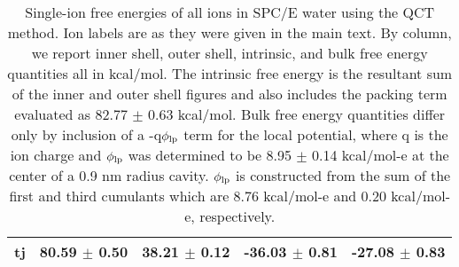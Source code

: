 \begin{table}
\begin{center}
\begin{tabular}{ccccc}
tj	&	80.59	$\pm$	0.50	&	38.21	$\pm$	0.12	&	-36.03	$\pm$	0.81	&	-27.08	$\pm$	0.83	\\
  \hline
  \hline
 \end{tabular}
 \end{center}
 \caption[Quasichemical partitioning of solvation free energies in water]{\label{tab:wat}Single-ion free energies of all ions in SPC/E water using the QCT method. 
 Ion labels are as they were given in the main text. By column, 
 we report inner shell, outer shell, intrinsic, and bulk free energy quantities all in kcal/mol. The intrinsic free energy is the resultant sum of the inner and 
 outer shell figures and also includes the packing term evaluated as 82.77 $\pm$ 0.63 kcal/mol. Bulk free energy quantities differ only by inclusion of a 
 -q$\phi_{\mathrm{lp}}$ term  for the local potential, where q is the ion charge and $\phi_{\mathrm{lp}}$ was determined to be 8.95 $\pm$ 0.14 kcal/mol-e at the center of 
 a 0.9 nm radius cavity. $\phi_{\mathrm{lp}}$ is constructed from the sum of the first and third cumulants which are 8.76 kcal/mol-e and 0.20 kcal/mol-e, respectively.}
\end{table}

